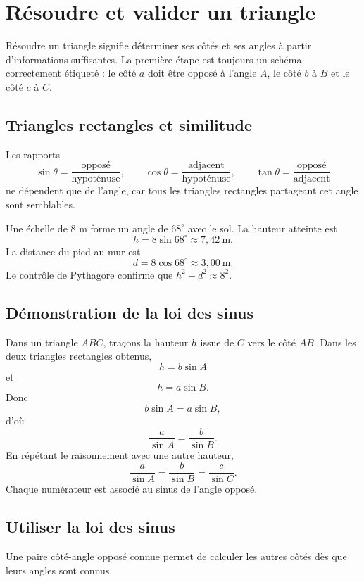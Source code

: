 \section{Résoudre et valider un triangle}
\label{manual:section:15.05}

Résoudre un triangle signifie déterminer ses côtés et ses angles à partir d'informations suffisantes. La première étape est toujours un schéma correctement étiqueté : le côté $a$ doit être opposé à l'angle $A$, le côté $b$ à $B$ et le côté $c$ à $C$.

\subsection{Triangles rectangles et similitude}

Les rapports
\[
\sin\theta=\frac{\text{opposé}}{\text{hypoténuse}},
\qquad
\cos\theta=\frac{\text{adjacent}}{\text{hypoténuse}},
\qquad
\tan\theta=\frac{\text{opposé}}{\text{adjacent}}
\]
ne dépendent que de l'angle, car tous les triangles rectangles partageant cet angle sont semblables.

\begin{examplebox}
Une échelle de $8$ m forme un angle de $68^\circ$ avec le sol. La hauteur atteinte est
\[
h=8\sin68^\circ\approx7{,}42\ \mathrm{m}.
\]
La distance du pied au mur est
\[
d=8\cos68^\circ\approx3{,}00\ \mathrm{m}.
\]
Le contrôle de Pythagore confirme que $h^2+d^2\approx8^2$.
\end{examplebox}

\subsection{Démonstration de la loi des sinus}

Dans un triangle $ABC$, traçons la hauteur $h$ issue de $C$ vers le côté $AB$. Dans les deux triangles rectangles obtenus,
\[
h=b\sin A
\]
et
\[
h=a\sin B.
\]
Donc
\[
b\sin A=a\sin B,
\]
d'où
\[
\frac a{\sin A}=\frac b{\sin B}.
\]
En répétant le raisonnement avec une autre hauteur,
\[
\frac a{\sin A}=\frac b{\sin B}=\frac c{\sin C}.
\]
Chaque numérateur est associé au sinus de l'angle opposé.

\subsection{Utiliser la loi des sinus}

Une paire côté-angle opposé connue permet de calculer les autres côtés dès que leurs angles sont connus.

